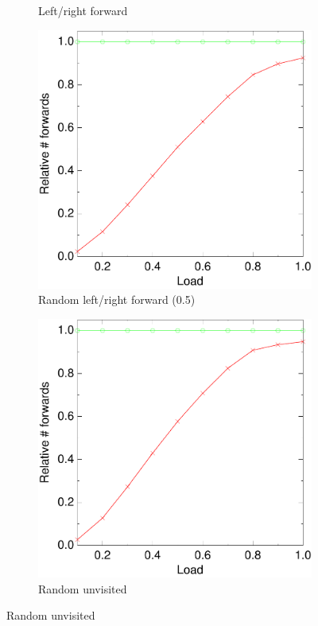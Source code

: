 \documentclass[10pt,a4paper]{article}
\begin{document}
\begin{figure}
\begin{subfigure}[b]{0.5\textwidth}
                \caption{Left/right forward}
        \end{subfigure}

        \vspace*{1.6em}

        \begin{subfigure}[b]{0.5\textwidth}
                \centering
                \includegraphics[width=\textwidth]{data/4randswitchrandswitch.pdf}
                \caption{Random left/right forward (0.5)}
        \end{subfigure}
        \begin{subfigure}[b]{0.5\textwidth}
                \centering
                \includegraphics[width=\textwidth]{data/4randunvisitedrandunvisited.pdf}
                \caption{Random unvisited}
        \end{subfigure}


\end{figure}
\end{document}
